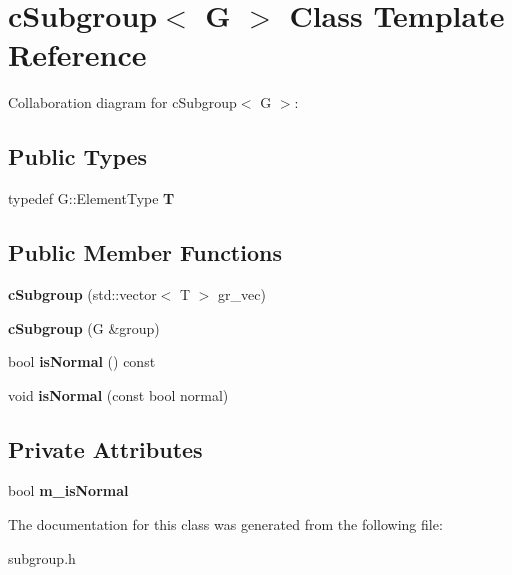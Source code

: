 \hypertarget{classcSubgroup}{\section{c\-Subgroup$<$ G $>$ Class Template Reference}
\label{classcSubgroup}
}


Collaboration diagram for c\-Subgroup$<$ G $>$\-:
\subsection*{Public Types}
\begin{DoxyCompactItemize}
\item 
\hypertarget{classcSubgroup_ab88b056e488e5b0b6c7849e9a4357371}{typedef G\-::\-Element\-Type {\bfseries T}}\label{classcSubgroup_ab88b056e488e5b0b6c7849e9a4357371}

\end{DoxyCompactItemize}
\subsection*{Public Member Functions}
\begin{DoxyCompactItemize}
\item 
\hypertarget{classcSubgroup_aa47db239ee5fc0c2904fc5870e102daa}{{\bfseries c\-Subgroup} (std\-::vector$<$ T $>$ gr\-\_\-vec)}\label{classcSubgroup_aa47db239ee5fc0c2904fc5870e102daa}

\item 
\hypertarget{classcSubgroup_ad10d7eaf034a3f96bfdb84e824f7ba30}{{\bfseries c\-Subgroup} (G \&group)}\label{classcSubgroup_ad10d7eaf034a3f96bfdb84e824f7ba30}

\item 
\hypertarget{classcSubgroup_a5c239313a0f1ae9ae64f87da3c552bee}{bool {\bfseries is\-Normal} () const }\label{classcSubgroup_a5c239313a0f1ae9ae64f87da3c552bee}

\item 
\hypertarget{classcSubgroup_a39fa2b6d316997d9ecbb2fc51cf86bc6}{void {\bfseries is\-Normal} (const bool normal)}\label{classcSubgroup_a39fa2b6d316997d9ecbb2fc51cf86bc6}

\end{DoxyCompactItemize}
\subsection*{Private Attributes}
\begin{DoxyCompactItemize}
\item 
\hypertarget{classcSubgroup_a21daac84974df25a48465da9438cb552}{bool {\bfseries m\-\_\-is\-Normal}}\label{classcSubgroup_a21daac84974df25a48465da9438cb552}

\end{DoxyCompactItemize}


The documentation for this class was generated from the following file\-:\begin{DoxyCompactItemize}
\item 
subgroup.\-h\end{DoxyCompactItemize}
